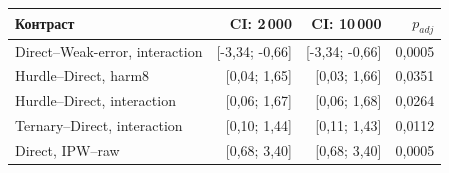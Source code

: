 \begin{tabular}{lrrr}
\toprule
Контраст & CI: 2\,000 & CI: 10\,000 & $p_{adj}$ \\
\midrule
Direct--Weak-error, interaction & [-3{,}34; -0{,}66] & [-3{,}34; -0{,}66] & 0{,}0005 \\
Hurdle--Direct, harm8 & [0{,}04; 1{,}65] & [0{,}03; 1{,}66] & 0{,}0351 \\
Hurdle--Direct, interaction & [0{,}06; 1{,}67] & [0{,}06; 1{,}68] & 0{,}0264 \\
Ternary--Direct, interaction & [0{,}10; 1{,}44] & [0{,}11; 1{,}43] & 0{,}0112 \\
Direct, IPW--raw & [0{,}68; 3{,}40] & [0{,}68; 3{,}40] & 0{,}0005 \\
\bottomrule
\end{tabular}
